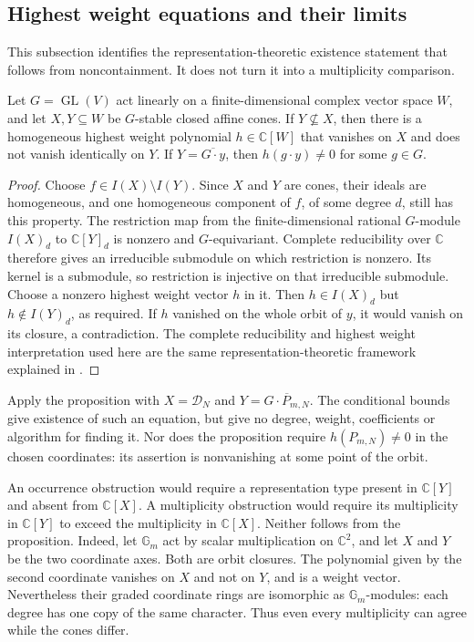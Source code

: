\subsection{Highest weight equations and their limits}

This subsection identifies the representation-theoretic existence
statement that follows from noncontainment.  It does not turn it
into a multiplicity comparison.

\begin{proposition}
\label{prop:highest-weight}
Let $G=\operatorname{GL}(V)$ act linearly on a finite-dimensional
complex vector space $W$, and let $X,Y\subseteq W$ be
$G$-stable closed affine cones.  If $Y\not\subseteq X$, then
there is a homogeneous highest weight polynomial $h\in\mathbb C[W]$
that vanishes on $X$ and does not vanish identically on $Y$.
If $Y=\overline{G\cdot y}$, then $h(g\cdot y)\ne0$ for some
$g\in G$.
\end{proposition}

\begin{proof}
Choose $f\in I(X)\setminus I(Y)$.  Since $X$ and $Y$ are
cones, their ideals are homogeneous, and one homogeneous
component of $f$, of some degree $d$, still has this property.
The restriction map from the finite-dimensional rational
$G$-module $I(X)_d$ to $\mathbb C[Y]_d$ is nonzero and
$G$-equivariant.  Complete reducibility over $\mathbb C$
therefore gives an irreducible submodule on which restriction
is nonzero.  Its kernel is a submodule, so restriction is
injective on that irreducible submodule.  Choose a nonzero
highest weight vector $h$ in it.  Then $h\in I(X)_d$ but
$h\notin I(Y)_d$, as required.  If $h$ vanished on the
whole orbit of $y$, it would vanish on its closure, a
contradiction.  The complete reducibility and highest weight
interpretation used here are the same representation-theoretic
framework explained in
\cite[Section~1(a)]{BurgisserIkenmeyerPanova2019}.
\end{proof}

Apply the proposition with $X=\mathcal D_N$ and
$Y=\overline{G\cdot P_{m,N}}$.  The conditional bounds give
existence of such an equation, but give no degree, weight,
coefficients or algorithm for finding it.  Nor does the
proposition require $h(P_{m,N})\ne0$ in the chosen coordinates:
its assertion is nonvanishing at some point of the orbit.

An occurrence obstruction would require a representation
type present in $\mathbb C[Y]$ and absent from $\mathbb C[X]$.
A multiplicity obstruction would require its multiplicity
in $\mathbb C[Y]$ to exceed the multiplicity in
$\mathbb C[X]$.  Neither follows from the proposition.
Indeed, let $\mathbb G_m$ act by scalar multiplication on
$\mathbb C^2$, and let $X$ and $Y$ be the two coordinate
axes.  Both are orbit closures.  The polynomial given by
the second coordinate vanishes on $X$ and not on $Y$,
and is a weight vector.  Nevertheless their graded
coordinate rings are isomorphic as $\mathbb G_m$-modules:
each degree has one copy of the same character.  Thus
even every multiplicity can agree while the cones differ.

